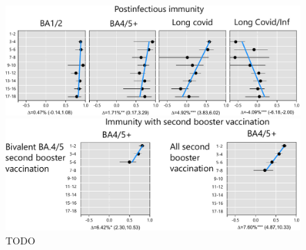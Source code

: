 \documentclass[sn-basic]{sn-jnl}%
\theoremstyle{thmstyleone}%
\theoremstyle{thmstyletwo}%
\theoremstyle{thmstylethree}%
\begin{document}
\begin{figure}
\begin{minipage}[b]{0.48\textwidth}
  \end{minipage}
\vspace{3mm}\\
  \begin{minipage}[b]{0.48\textwidth}
    \centering
    \includegraphics[width=\textwidth]{inf_FINAL.pdf}
   \end{minipage}
   \hspace{0.045\textwidth}
  \begin{minipage}[b]{0.46\textwidth}
    \centering
   \includegraphics[width=\textwidth]{2secboosters_FINAL.pdf}
   
  \end{minipage}
\caption{TODO}
\label{trends}
\end{figure}
\end{document}
